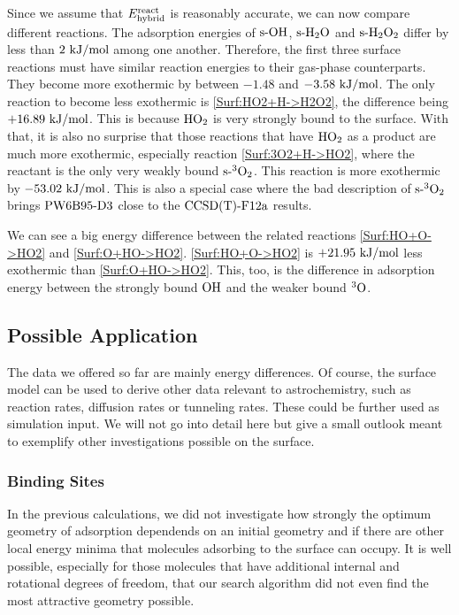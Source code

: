 Since we assume that $E^{\text{react}}_{\text{hybrid}}$ is reasonably accurate, we can now compare
different reactions. The adsorption energies of $\text{s-}\text O \text H$, $\text{s-}\text H _2 \text O$ and
$\text{s-}\text H _2 \text O_2$ differ by less than $2~\text {kJ/mol}$ among one another. Therefore,
the first three surface reactions must have similar reaction energies
to their gas-phase counterparts. They become more exothermic by between
$-1.48$ and $-3.58~\text {kJ/mol}$. The only reaction to become less exothermic
is \eqref{Surf:HO2+H->H2O2}, the difference being $+16.89~\text {kJ/mol}$. This
is because $\text H \text O_2$ is very strongly
bound to the surface. With that, it is also no surprise that those
reactions that have $\text H \text O_2$ as a product are much more exothermic, especially
reaction \eqref{Surf:3O2+H->HO2}, where the reactant is the only
very weakly bound $\text{s-}{^3\ensuremath{\text O_2}}$. This reaction is more exothermic
by $-53.02~\text {kJ/mol}$. This is also a special case where the bad description
of $\text{s-}{^3\ensuremath{\text O_2}}$ brings $\text{PW6B95}\text{-D3}$ close to the $\text{CCSD(T)-F12a}$ results.

We can see a big energy difference between the related reactions
\eqref{Surf:HO+O->HO2} and \eqref{Surf:O+HO->HO2}. \eqref{Surf:HO+O->HO2}
is $+21.95~\text {kJ/mol}$ less exothermic than \eqref{Surf:O+HO->HO2}. This, too,
is the difference in adsorption energy between the strongly bound $\text O \text H$
and the weaker bound ${^3\text{O}}$.

\subsection{Possible Application}

The data we offered so far are mainly energy differences. Of course, the
surface model can be used to derive other data relevant to astrochemistry,
such as reaction rates, diffusion rates or tunneling rates. These could be
further used as simulation input. We will not go into detail here but give a small
outlook meant to exemplify other investigations possible on the surface. 

\subsubsection{Binding Sites}
\newcommand\rmax{\enmat{r_{\te{max}}}}
\newcommand\rmin{\enmat{r_{\te{min}}}}
\label{Sec:Adv:Binding}


In the previous calculations, we did not investigate how strongly the optimum
geometry of adsorption dependends on an initial geometry and if there
are other local energy minima that molecules adsorbing to the surface can occupy.
It is well possible, especially for those molecules that have additional
internal and rotational degrees of freedom, that our search
algorithm did not even find the most attractive geometry possible.

